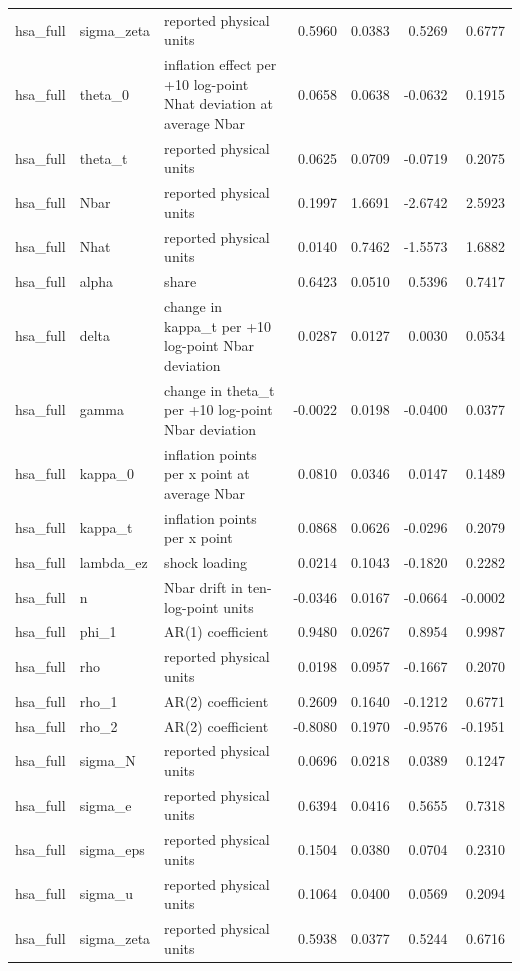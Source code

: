 \begin{tabular}{lllrrrr}
hsa\_full & sigma\_zeta & reported physical units & 0.5960 & 0.0383 & 0.5269 & 0.6777 \\
hsa\_full & theta\_0 & inflation effect per +10 log-point Nhat deviation at average Nbar & 0.0658 & 0.0638 & -0.0632 & 0.1915 \\
hsa\_full & theta\_t & reported physical units & 0.0625 & 0.0709 & -0.0719 & 0.2075 \\
hsa\_full & Nbar & reported physical units & 0.1997 & 1.6691 & -2.6742 & 2.5923 \\
hsa\_full & Nhat & reported physical units & 0.0140 & 0.7462 & -1.5573 & 1.6882 \\
hsa\_full & alpha & share & 0.6423 & 0.0510 & 0.5396 & 0.7417 \\
hsa\_full & delta & change in kappa\_t per +10 log-point Nbar deviation & 0.0287 & 0.0127 & 0.0030 & 0.0534 \\
hsa\_full & gamma & change in theta\_t per +10 log-point Nbar deviation & -0.0022 & 0.0198 & -0.0400 & 0.0377 \\
hsa\_full & kappa\_0 & inflation points per x point at average Nbar & 0.0810 & 0.0346 & 0.0147 & 0.1489 \\
hsa\_full & kappa\_t & inflation points per x point & 0.0868 & 0.0626 & -0.0296 & 0.2079 \\
hsa\_full & lambda\_ez & shock loading & 0.0214 & 0.1043 & -0.1820 & 0.2282 \\
hsa\_full & n & Nbar drift in ten-log-point units & -0.0346 & 0.0167 & -0.0664 & -0.0002 \\
hsa\_full & phi\_1 & AR(1) coefficient & 0.9480 & 0.0267 & 0.8954 & 0.9987 \\
hsa\_full & rho & reported physical units & 0.0198 & 0.0957 & -0.1667 & 0.2070 \\
hsa\_full & rho\_1 & AR(2) coefficient & 0.2609 & 0.1640 & -0.1212 & 0.6771 \\
hsa\_full & rho\_2 & AR(2) coefficient & -0.8080 & 0.1970 & -0.9576 & -0.1951 \\
hsa\_full & sigma\_N & reported physical units & 0.0696 & 0.0218 & 0.0389 & 0.1247 \\
hsa\_full & sigma\_e & reported physical units & 0.6394 & 0.0416 & 0.5655 & 0.7318 \\
hsa\_full & sigma\_eps & reported physical units & 0.1504 & 0.0380 & 0.0704 & 0.2310 \\
hsa\_full & sigma\_u & reported physical units & 0.1064 & 0.0400 & 0.0569 & 0.2094 \\
hsa\_full & sigma\_zeta & reported physical units & 0.5938 & 0.0377 & 0.5244 & 0.6716 \\

\end{tabular}
